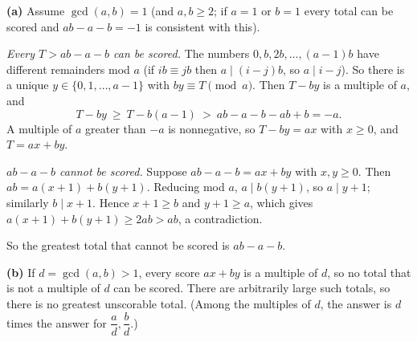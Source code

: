 \textbf{(a)} Assume $\gcd(a,b)=1$ (and $a,b\ge2$; if $a=1$ or $b=1$ every total can be scored and $ab-a-b=-1$ is consistent with this).

\emph{Every $T>ab-a-b$ can be scored.} The numbers $0,b,2b,\dots,(a-1)b$ have different remainders mod $a$ (if $ib\equiv jb$ then $a\mid (i-j)b$, so $a\mid i-j$). So there is a unique $y\in\{0,1,\dots,a-1\}$ with $by\equiv T\pmod a$. Then $T-by$ is a multiple of $a$, and
\[
T-by\ \ge\ T-b(a-1)\ >\ ab-a-b-ab+b=-a .
\]
A multiple of $a$ greater than $-a$ is nonnegative, so $T-by=ax$ with $x\ge0$, and $T=ax+by$.

\emph{$ab-a-b$ cannot be scored.} Suppose $ab-a-b=ax+by$ with $x,y\ge0$. Then $ab=a(x+1)+b(y+1)$. Reducing mod $a$, $a\mid b(y+1)$, so $a\mid y+1$; similarly $b\mid x+1$. Hence $x+1\ge b$ and $y+1\ge a$, which gives $a(x+1)+b(y+1)\ge2ab>ab$, a contradiction.

So the greatest total that cannot be scored is $\boxed{ab-a-b}$.

\textbf{(b)} If $d=\gcd(a,b)>1$, every score $ax+by$ is a multiple of $d$, so no total that is not a multiple of $d$ can be scored. There are arbitrarily large such totals, so there is no greatest unscorable total. (Among the multiples of $d$, the answer is $d$ times the answer for $\dfrac {a}{d},\dfrac {b}{d}$.)
